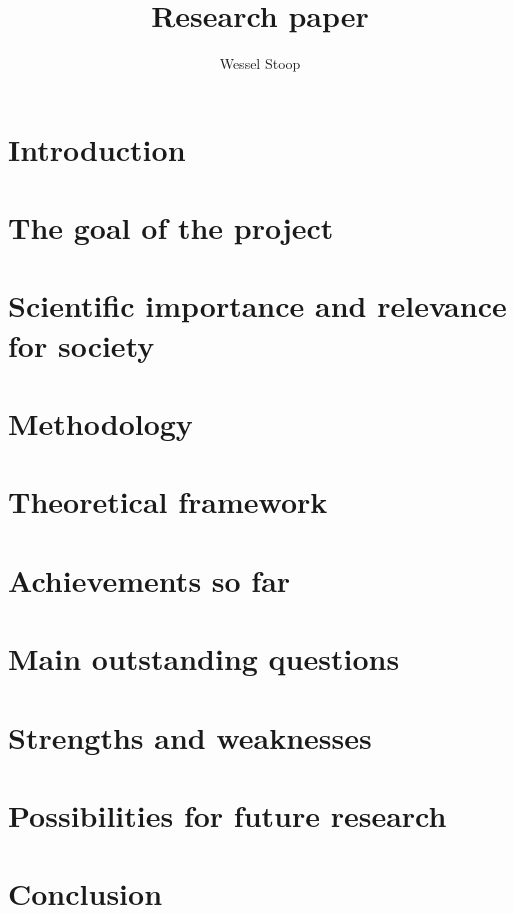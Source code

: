 \documentclass[12pt]{article}
\title{Research paper}
\author{Wessel Stoop}
\begin{document}
\maketitle

\section{Introduction}
\section{The goal of the project}
\section{Scientific importance and relevance for society}
\section{Methodology}
\section{Theoretical framework}
\section{Achievements so far}
\section{Main outstanding questions}
\section{Strengths and weaknesses}
\section{Possibilities for future research}
\section{Conclusion}
\end{document}
